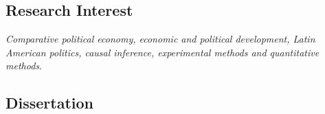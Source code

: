 \subsection*{Research Interest}

	\emph{Comparative political economy, economic and political development, Latin American politics, causal inference, experimental methods and quantitative methods}.

\subsection*{Dissertation}

	{\unskip}
